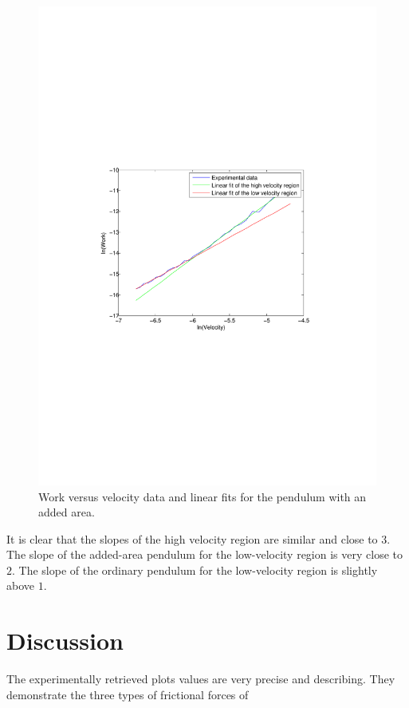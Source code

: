 ﻿\documentclass[11pt, a4paper]{article}
\begin{document}
\begin{figure}[h]
	\centering
	\includegraphics[trim=10.0cm 10.0cm 10.0cm 10.0cm, scale=0.7]{paper}
	\caption{Work versus velocity data and  linear fits for the pendulum with an added area.}
	\label{f:paper}
\end{figure}

It is clear that the slopes of the high velocity region are similar and close to $3$. 
The slope of the added-area pendulum for the low-velocity region is very close to $2$.
The slope of the ordinary pendulum for the low-velocity region is slightly above $1$.



\section{Discussion}
The experimentally retrieved plots values are very precise and describing. 
They demonstrate the three types of frictional forces of 
\end{document}
